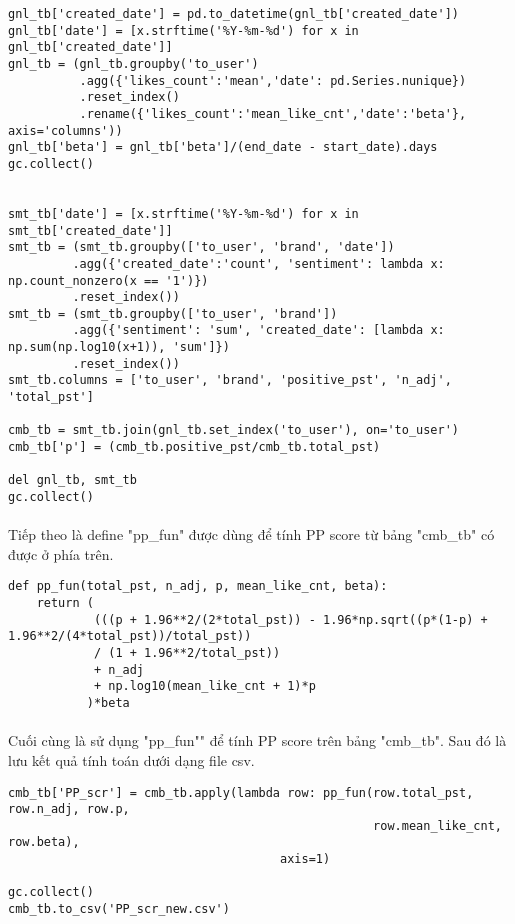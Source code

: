 \documentclass[12pt]{article}
\numberwithin{equation}{section}
\begin{document}
\begin{lstlisting}
gnl_tb['created_date'] = pd.to_datetime(gnl_tb['created_date'])
gnl_tb['date'] = [x.strftime('%Y-%m-%d') for x in gnl_tb['created_date']]
gnl_tb = (gnl_tb.groupby('to_user')
          .agg({'likes_count':'mean','date': pd.Series.nunique})
          .reset_index()
          .rename({'likes_count':'mean_like_cnt','date':'beta'}, axis='columns'))
gnl_tb['beta'] = gnl_tb['beta']/(end_date - start_date).days
gc.collect()


smt_tb['date'] = [x.strftime('%Y-%m-%d') for x in smt_tb['created_date']]
smt_tb = (smt_tb.groupby(['to_user', 'brand', 'date'])
         .agg({'created_date':'count', 'sentiment': lambda x: np.count_nonzero(x == '1')})
         .reset_index())
smt_tb = (smt_tb.groupby(['to_user', 'brand'])
         .agg({'sentiment': 'sum', 'created_date': [lambda x: np.sum(np.log10(x+1)), 'sum']})
         .reset_index())
smt_tb.columns = ['to_user', 'brand', 'positive_pst', 'n_adj', 'total_pst']

cmb_tb = smt_tb.join(gnl_tb.set_index('to_user'), on='to_user')
cmb_tb['p'] = (cmb_tb.positive_pst/cmb_tb.total_pst)

del gnl_tb, smt_tb
gc.collect()
\end{lstlisting}

\paragraph{} Tiếp theo là define "pp\_fun" được dùng để tính PP score từ bảng "cmb\_tb" có được ở phía trên.

\begin{lstlisting}
def pp_fun(total_pst, n_adj, p, mean_like_cnt, beta):
    return (
            (((p + 1.96**2/(2*total_pst)) - 1.96*np.sqrt((p*(1-p) + 1.96**2/(4*total_pst))/total_pst))
            / (1 + 1.96**2/total_pst))
            + n_adj
            + np.log10(mean_like_cnt + 1)*p
           )*beta
\end{lstlisting}

\paragraph{} Cuối cùng là sử dụng "pp\_fun"" để tính PP score trên bảng "cmb\_tb". Sau đó là lưu kết quả tính toán dưới dạng file csv.

\begin{lstlisting}
cmb_tb['PP_scr'] = cmb_tb.apply(lambda row: pp_fun(row.total_pst, row.n_adj, row.p,
                                                   row.mean_like_cnt, row.beta),
                                      axis=1)

gc.collect()
cmb_tb.to_csv('PP_scr_new.csv')
\end{lstlisting}

\nocite{*}


\end{document}
